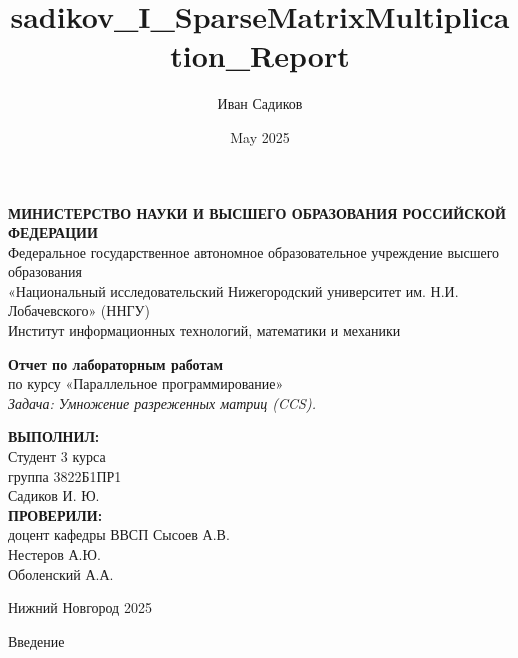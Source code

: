 \documentclass[12pt]{article}
\title{sadikov_I_SparseMatrixMultiplication_Report}
\author{Иван Садиков}
\date{May 2025}
\begin{document}
\begin{titlepage}
\begin{center}

\begin{center}
    \textbf{МИНИСТЕРСТВО НАУКИ И ВЫСШЕГО ОБРАЗОВАНИЯ РОССИЙСКОЙ ФЕДЕРАЦИИ} \\
    Федеральное государственное автономное образовательное учреждение высшего образования \\
    «Национальный исследовательский Нижегородский университет им. Н.И. Лобачевского» (ННГУ) \\
    Институт информационных технологий, математики и механики
\end{center}

\vspace{3cm}

\begin{center}
    \textbf{Отчет по лабораторным работам} \vspace{0.5cm}\\
    по курсу «Параллельное программирование» \vspace{0.5cm}\\
    \textit{Задача: Умножение разреженных матриц (CCS).}
\end{center}

\vspace{3cm}

\begin{flushright}
    \textbf{ВЫПОЛНИЛ:} \\ 
    Студент 3 курса \\
    группа 3822Б1ПР1 \\ 
    Садиков И. Ю. \\
    \vspace{0.5cm}
    \textbf{ПРОВЕРИЛИ:} \\ 
    доцент кафедры ВВСП Сысоев А.В. \\
    Нестеров А.Ю. \\ 
    Оболенский А.А. 
\end{flushright}

\vspace{1cm}

\begin{center}
    Нижний Новгород 2025\newpage
\end{center}

\end{center}
\end{titlepage}
\newpage
\begin{center}
\Large{Введение}
\end{center}
\end{document}
